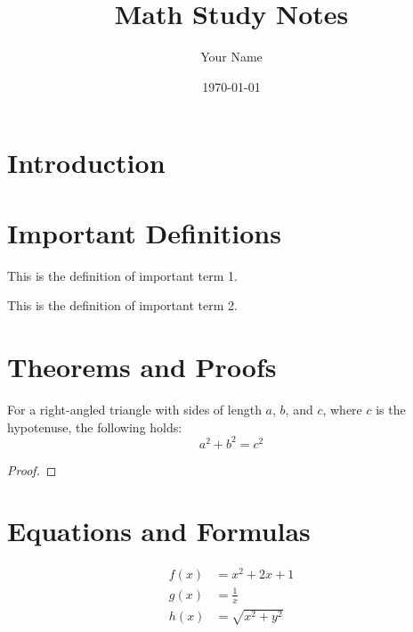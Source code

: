 \documentclass[10pt]{article}
\title{Math Study Notes}
\author{Your Name}
\date{\today}
\begin{document}
\maketitle

\section{Introduction}


\section{Important Definitions}

\begin{definition}
    This is the definition of important term 1.
\end{definition}

\begin{definition}
    This is the definition of important term 2.
\end{definition}

\section{Theorems and Proofs}

\begin{theorem}
    For a right-angled triangle with sides of length $a$, $b$, and $c$, where $c$ is the hypotenuse, the following holds:
    \[ a^2 + b^2 = c^2 \]
\end{theorem}

\begin{proof}
\end{proof}

\section{Equations and Formulas}

\begin{align*}
    f(x) & = x^2 + 2x + 1     \\
    g(x) & = \frac{1}{x}      \\
    h(x) & = \sqrt{x^2 + y^2}
\end{align*}
\end{document}

